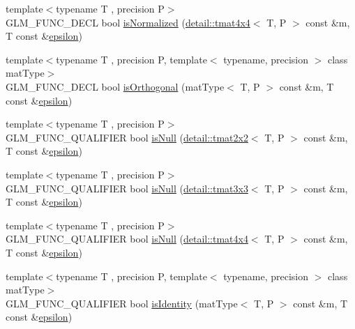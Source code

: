 \begin{DoxyCompactItemize}
\item 
{\footnotesize template$<$typename T , precision P$>$ }\\G\+L\+M\+\_\+\+F\+U\+N\+C\+\_\+\+D\+E\+CL bool \hyperlink{group__gtx__matrix__query_gad0ff11cc2c26d3086d9f88316a321637}{is\+Normalized} (\hyperlink{structglm_1_1detail_1_1tmat4x4}{detail\+::tmat4x4}$<$ T, P $>$ const \&m, T const \&\hyperlink{group__gtc__constants_gacb41049b8d22c8aa90e362b96c524feb}{epsilon})
\item 
{\footnotesize template$<$typename T , precision P, template$<$ typename, precision $>$ class mat\+Type$>$ }\\G\+L\+M\+\_\+\+F\+U\+N\+C\+\_\+\+D\+E\+CL bool \hyperlink{group__gtx__matrix__query_gab2cb5d23df77b4e4e63ad2965acd31b3}{is\+Orthogonal} (mat\+Type$<$ T, P $>$ const \&m, T const \&\hyperlink{group__gtc__constants_gacb41049b8d22c8aa90e362b96c524feb}{epsilon})
\item 
{\footnotesize template$<$typename T , precision P$>$ }\\G\+L\+M\+\_\+\+F\+U\+N\+C\+\_\+\+Q\+U\+A\+L\+I\+F\+I\+ER bool \hyperlink{group__gtx__matrix__query_gaf7e38680b67a3589a262d281660e4694}{is\+Null} (\hyperlink{structglm_1_1detail_1_1tmat2x2}{detail\+::tmat2x2}$<$ T, P $>$ const \&m, T const \&\hyperlink{group__gtc__constants_gacb41049b8d22c8aa90e362b96c524feb}{epsilon})
\item 
{\footnotesize template$<$typename T , precision P$>$ }\\G\+L\+M\+\_\+\+F\+U\+N\+C\+\_\+\+Q\+U\+A\+L\+I\+F\+I\+ER bool \hyperlink{group__gtx__matrix__query_ga7a6ef9f174fec0224214ff5ba6c27ba4}{is\+Null} (\hyperlink{structglm_1_1detail_1_1tmat3x3}{detail\+::tmat3x3}$<$ T, P $>$ const \&m, T const \&\hyperlink{group__gtc__constants_gacb41049b8d22c8aa90e362b96c524feb}{epsilon})
\item 
{\footnotesize template$<$typename T , precision P$>$ }\\G\+L\+M\+\_\+\+F\+U\+N\+C\+\_\+\+Q\+U\+A\+L\+I\+F\+I\+ER bool \hyperlink{group__gtx__matrix__query_ga5b8d7b0c7bf1d48ff8df10321440a61a}{is\+Null} (\hyperlink{structglm_1_1detail_1_1tmat4x4}{detail\+::tmat4x4}$<$ T, P $>$ const \&m, T const \&\hyperlink{group__gtc__constants_gacb41049b8d22c8aa90e362b96c524feb}{epsilon})
\item 
{\footnotesize template$<$typename T , precision P, template$<$ typename, precision $>$ class mat\+Type$>$ }\\G\+L\+M\+\_\+\+F\+U\+N\+C\+\_\+\+Q\+U\+A\+L\+I\+F\+I\+ER bool \hyperlink{group__gtx__matrix__query_gafc1ce12c738b8c5d007179e615609330}{is\+Identity} (mat\+Type$<$ T, P $>$ const \&m, T const \&\hyperlink{group__gtc__constants_gacb41049b8d22c8aa90e362b96c524feb}{epsilon})

\end{DoxyCompactItemize}
